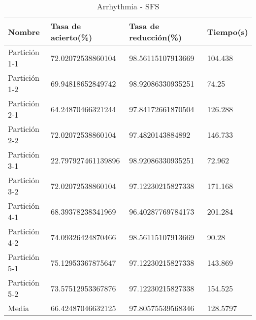 \begin{table}[H]
	\centering
	\begin{tabular}{l|lll}
		Nombre        & Tasa de acierto(\%) & Tasa de reducción(\%) & Tiempo(s) \\ \hline
		Partición 1-1 & 72.02072538860104   & 98.56115107913669     & 104.438   \\
		Partición 1-2 & 69.94818652849742   & 98.92086330935251     & 74.25     \\
		Partición 2-1 & 64.24870466321244   & 97.84172661870504     & 126.288   \\
		Partición 2-2 & 72.02072538860104   & 97.4820143884892      & 146.733   \\
		Partición 3-1 & 22.797927461139896  & 98.92086330935251     & 72.962    \\
		Partición 3-2 & 72.02072538860104   & 97.12230215827338     & 171.168   \\
		Partición 4-1 & 68.39378238341969   & 96.40287769784173     & 201.284   \\
		Partición 4-2 & 74.09326424870466   & 98.56115107913669     & 90.28     \\
		Partición 5-1 & 75.12953367875647   & 97.12230215827338     & 143.869   \\
		Partición 5-2 & 73.57512953367876   & 97.12230215827338     & 154.525   \\ \hline
		Media         & 66.42487046632125   & 97.80575539568346     & 128.5797 
	\end{tabular}
	\caption{Arrhythmia - SFS}
	\label{ARRH-SFS}
\end{table}